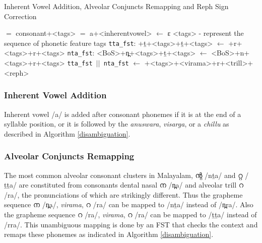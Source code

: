 \documentclass{ieeeaccess}
\begin{document}
\begin{algorithm*}
	\caption{Inherent Vowel Addition, Alveolar Conjuncts Remapping and Reph Sign Correction}\label{disambiguation}
	\begin{algorithmic}[1]
         $=$ {\ipa consonant+<tags>} 
		 $=$ {} 
		\State {} {\ipa a+<inherentvowel>} {} $\gets$ {}  {\ipa ɛ } {\ipa [post\_context]}
	\EndProcedure  \Comment <tags> - represent the sequence of phonetic feature tags
		\State \texttt{tta\_fst}: {+ṯ+<tags>+ṯ+<tags>} $\gets$ {+r+<tags>+r+<tags>}
		\State \texttt{nta\_fst}: {\ipa <BoS>+n̪+<tags>+ṯ+<tags>} $\gets$ {\ipa <BoS>+n+<tags>+r+<tags>}
		\State \Return \texttt{tta\_fst $||$ nta\_fst} 
		\EndProcedure
		\State {} $\gets$ {\ipa [ɡ,d̪]+<tags>+<virama>+r+<trill>+<reph>}
	\EndProcedure
	\end{algorithmic}
\end{algorithm*}


\subsubsection{Inherent Vowel Addition}

Inherent vowel {\ipa /a/} is added after consonant phonemes if it is at the end of a syllable position, or it is followed by the \textit{anuswara}, \textit{visarga}, or a \textit{chillu} as described in Algorithm \ref{disambiguation}.



\subsubsection{Alveolar Conjuncts Remapping}

The most common alveolar consonant clusters in Malayalam, {\mal ന്റ} {\ipa /nṯa/} and {\mal റ്റ} {\ipa /ṯṯa/} are constituted from consonants dental nasal {\mal ന} /{\ipa n̪a/} and alveolar trill {\mal റ} {\ipa /ra/}, the pronunciations of which are strikingly different. Thus the grapheme sequence {\mal ന} {\ipa /n̪a/}, \textit{virama}, {\mal റ} {\ipa /ra/} can  be mapped to {\ipa /nṯa/} instead of {\ipa /n̪ra/}. Also the grapheme sequence {\mal റ} {\ipa /ra/}, \textit{virama}, {\mal റ} {\ipa /ra/} can  be mapped to {\ipa /ṯṯa/} instead of {\ipa /rra/}. This unambiguous mapping is done by an FST  that checks the context and remaps these phonemes as indicated in Algorithm \ref{disambiguation}.
\end{document}
